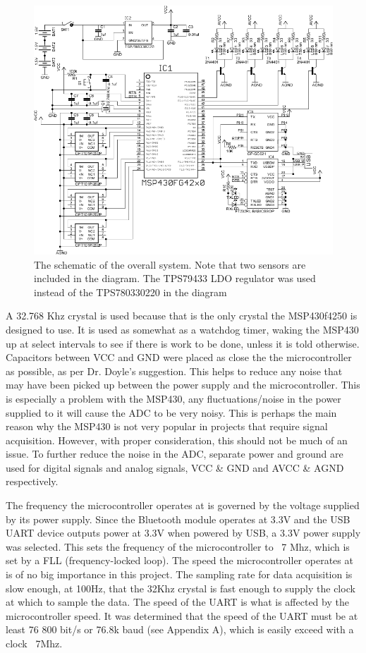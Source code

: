 \begin{figure}[htp]
\centering
\includegraphics[width=6in]{mcu.png}
\caption[Schematic of the system]{The schematic of the overall system. Note that two sensors are included in the diagram. The TPS79433 LDO regulator was used instead of the TPS780330220 in the diagram}
\end{figure}

A 32.768 Khz crystal is used because that is the only crystal the MSP430f4250 is designed to use. It is used as somewhat as a watchdog timer, waking the MSP430 up at select intervals to see if there is work to be done, unless it is told otherwise. Capacitors between VCC and GND were placed as close the the microcontroller as possible, as per Dr. Doyle's suggestion. This helps to reduce any noise that may have been picked up between the power supply and the microcontroller. This is especially a problem with the MSP430, any fluctuations/noise in the power supplied to it will cause the ADC to be very noisy. This is perhaps the main reason why the MSP430 is not very popular in projects that require signal acquisition. However, with proper consideration, this should not be much of an issue. To further reduce the noise in the ADC, separate power and ground are used for digital signals and analog signals, VCC \& GND and AVCC \& AGND respectively. 

The frequency the microcontroller operates at is governed by the voltage supplied by its power supply. Since the Bluetooth module operates at 3.3V and the USB UART device outputs power at 3.3V when powered by USB, a 3.3V power supply was selected. This sets the frequency of the microcontroller to ~7 Mhz, which is set by a FLL (frequency-locked loop). The speed the microcontroller operates at is of no big importance in this project. The sampling rate for data acquisition is slow enough, at 100Hz, that the 32Khz crystal is fast enough to supply the clock at which to sample the data. The speed of the UART is what is affected by the microcontroller speed. It was determined that the speed of the UART must be at least 76 800 bit/s or 76.8k baud (see Appendix A), which is easily exceed with a clock ~7Mhz.

